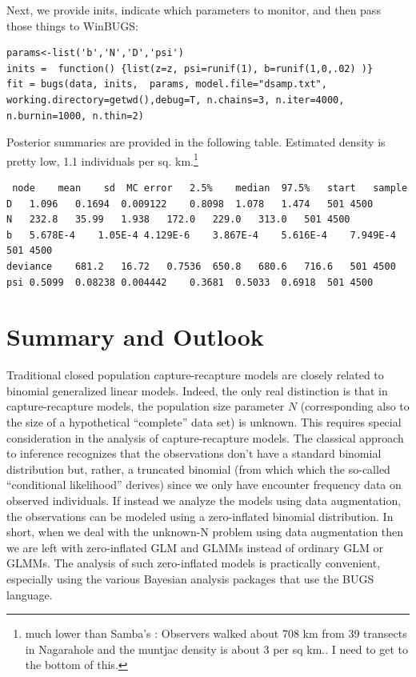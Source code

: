Next, we provide inits, indicate which parameters to monitor, and then pass those things to WinBUGS:
\begin{verbatim}
params<-list('b','N','D','psi')
inits =  function() {list(z=z, psi=runif(1), b=runif(1,0,.02) )}
fit = bugs(data, inits,  params, model.file="dsamp.txt",
working.directory=getwd(),debug=T, n.chains=3, n.iter=4000, n.burnin=1000, n.thin=2)
\end{verbatim}
Posterior summaries are provided in the following table. Estimated density is pretty low, 1.1 individuals per sq. km.\footnote{ much lower than Samba's : Observers walked about 708 km from 39 transects in Nagarahole and the muntjac density is about 3 per sq km.. I need to get to the bottom of this.}
\begin{verbatim}
 node	 mean	 sd	 MC error	2.5%	median	97.5%	start	sample
D	1.096	0.1694	0.009122	0.8098	1.078	1.474	501	4500
N	232.8	35.99	1.938	172.0	229.0	313.0	501	4500
b	5.678E-4	1.05E-4	4.129E-6	3.867E-4	5.616E-4	7.949E-4	501	4500
deviance	681.2	16.72	0.7536	650.8	680.6	716.6	501	4500
psi	0.5099	0.08238	0.004442	0.3681	0.5033	0.6918	501	4500
\end{verbatim}


\section{Summary and Outlook}

Traditional closed population capture-recapture models are closely related to binomial generalized linear models.  Indeed, the only real distinction is that in capture-recapture models, the population size parameter $N$ (corresponding also to the size of a hypothetical ``complete'' data set) is unknown.  This requires special consideration in the analysis of capture-recapture models. The classical approach to inference recognizes that the observations don't have a standard binomial distribution but, rather, a truncated binomial (from which which the so-called ``conditional likelihood'' derives) since we only have encounter frequency data on observed individuals. If instead we analyze the models using data augmentation, the observations can be modeled using a zero-inflated binomial distribution. In short, when we deal with the unknown-N problem using data augmentation then we are left with zero-inflated GLM and GLMMs instead of ordinary GLM or GLMMs. The analysis of such zero-inflated models is practically convenient, especially using the various Bayesian analysis packages that use the BUGS language. 

